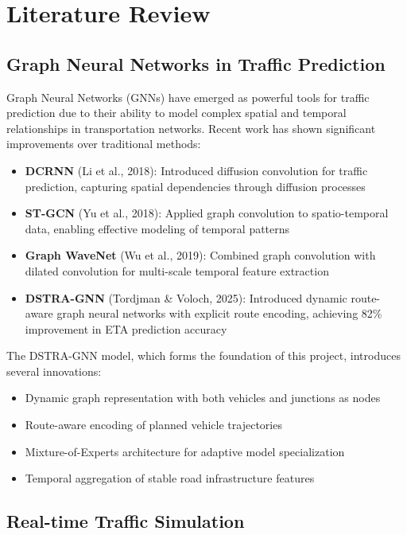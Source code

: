 \section{Literature Review}

\subsection{Graph Neural Networks in Traffic Prediction}

Graph Neural Networks (GNNs) have emerged as powerful tools for traffic prediction due to their ability to model complex spatial and temporal relationships in transportation networks. Recent work has shown significant improvements over traditional methods:

\begin{itemize}
    \item \textbf{DCRNN} (Li et al., 2018): Introduced diffusion convolution for traffic prediction, capturing spatial dependencies through diffusion processes
    \item \textbf{ST-GCN} (Yu et al., 2018): Applied graph convolution to spatio-temporal data, enabling effective modeling of temporal patterns
    \item \textbf{Graph WaveNet} (Wu et al., 2019): Combined graph convolution with dilated convolution for multi-scale temporal feature extraction
    \item \textbf{DSTRA-GNN} (Tordjman \& Voloch, 2025): Introduced dynamic route-aware graph neural networks with explicit route encoding, achieving 82\% improvement in ETA prediction accuracy
\end{itemize}

The DSTRA-GNN model, which forms the foundation of this project, introduces several innovations:
\begin{itemize}
    \item Dynamic graph representation with both vehicles and junctions as nodes
    \item Route-aware encoding of planned vehicle trajectories
    \item Mixture-of-Experts architecture for adaptive model specialization
    \item Temporal aggregation of stable road infrastructure features
\end{itemize}

\subsection{Real-time Traffic Simulation}

